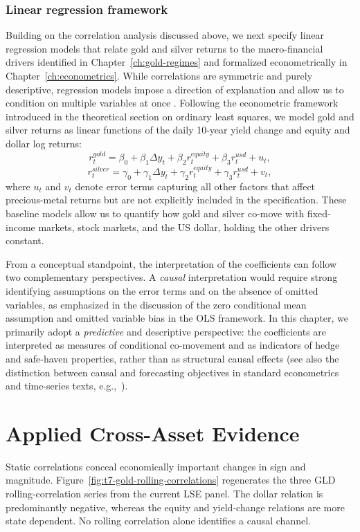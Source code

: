\subsubsection{Linear regression framework}


Building on the correlation analysis discussed above, we next specify linear regression models that relate gold and silver returns to the macro-financial drivers identified in Chapter~\ref{ch:gold-regimes} and formalized econometrically in Chapter~\ref{ch:econometrics}.
While correlations are symmetric and purely descriptive, regression models impose a
direction of explanation and allow us to condition on multiple variables at once
\cite{Wooldridge2020}. Following the econometric framework introduced in the theoretical
section on ordinary least squares, we model gold and silver returns as linear functions of
the daily 10-year yield change and equity and dollar log returns:
\[
r^{gold}_t = \beta_0 + \beta_1 \Delta y_t + \beta_2 r^{equity}_t
+ \beta_3 r^{usd}_t + u_t,
\]
\[
r^{silver}_t = \gamma_0 + \gamma_1 \Delta y_t + \gamma_2 r^{equity}_t
+ \gamma_3 r^{usd}_t + v_t,
\]
where $u_t$ and $v_t$ denote error terms capturing all other factors that affect precious-metal
returns but are not explicitly included in the specification. These baseline models
allow us to quantify how gold and silver co-move with fixed-income markets, stock markets,
and the US dollar, holding the other drivers constant.

From a conceptual standpoint, the interpretation of the coefficients can follow two
complementary perspectives. A \emph{causal} interpretation would require strong identifying
assumptions on the error terms and on the absence of omitted variables, as emphasized in
the discussion of the zero conditional mean assumption and omitted variable bias in the
OLS framework. In this chapter, we primarily adopt a \emph{predictive} and descriptive
perspective: the coefficients are interpreted as measures of conditional co-movement and as
indicators of hedge and safe-haven properties, rather than as structural causal effects
(see also the distinction between causal and forecasting objectives in standard
econometrics and time-series texts, e.g.,~\cite{Wooldridge2020,Tsay2010}).

\section{Applied Cross-Asset Evidence}

Static correlations conceal economically important changes in sign and
magnitude. Figure~\ref{fig:t7-gold-rolling-correlations} regenerates the three
GLD rolling-correlation series from the current LSE panel. The dollar relation is
predominantly negative, whereas the equity and yield-change relations are more
state dependent. No rolling correlation alone identifies a causal channel.

